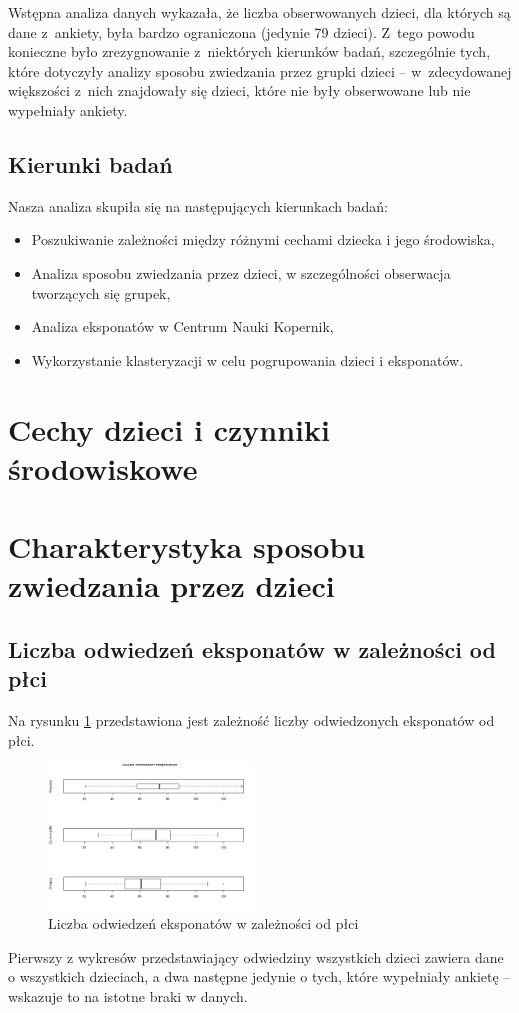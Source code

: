 \documentclass[conference]{IEEEtran}
\begin{document}
Wstępna analiza danych wykazała, że liczba obserwowanych dzieci, dla których są dane z~ankiety, była bardzo ograniczona (jedynie 79 dzieci). Z~tego powodu konieczne było zrezygnowanie z~niektórych kierunków badań, szczególnie tych, które dotyczyły analizy sposobu zwiedzania przez grupki dzieci -- w~zdecydowanej większości z~nich znajdowały się dzieci, które nie były obserwowane lub nie wypełniały ankiety.
\subsection{Kierunki badań}
Nasza analiza skupiła się na następujących kierunkach badań:
\begin{itemize}
\item Poszukiwanie zależności między różnymi cechami dziecka i jego środowiska,
\item Analiza sposobu zwiedzania przez dzieci, w szczególności obserwacja tworzących się grupek,
\item Analiza eksponatów w Centrum Nauki Kopernik,
\item Wykorzystanie klasteryzacji w celu pogrupowania dzieci i eksponatów.
\end{itemize}

\section{Cechy dzieci i czynniki środowiskowe}

\section{Charakterystyka sposobu zwiedzania przez dzieci}
\subsection{Liczba odwiedzeń eksponatów w zależności od płci}
Na rysunku \ref{odwiedziny_plcie} przedstawiona jest zależność liczby odwiedzonych eksponatów od płci.
\begin{figure}[H]
\includegraphics[width=0.48\textwidth]{odwiedziny_plcie.png}
\caption{Liczba odwiedzeń eksponatów w zależności od płci}
\label{odwiedziny_plcie}
\end{figure}
Pierwszy z wykresów przedstawiający odwiedziny wszystkich dzieci zawiera dane o wszystkich dzieciach, a dwa następne jedynie o tych, które wypełniały ankietę -- wskazuje to na istotne braki w danych.
\end{document}
